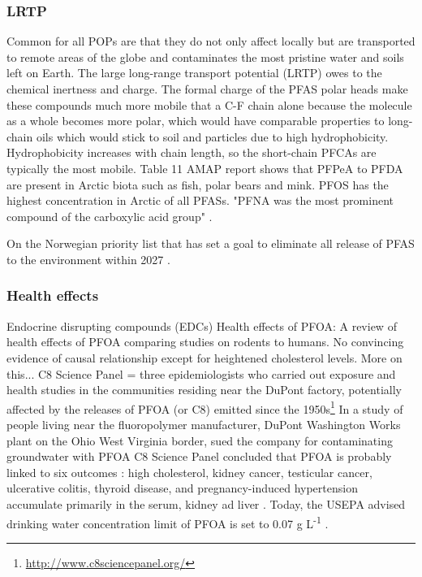 \subsubsection{LRTP}
Common for all POPs are that they do not only affect locally but are transported to remote areas of the globe and contaminates the most pristine water and soils left on Earth. The large long-range transport potential (LRTP) owes to the chemical inertness and charge. The formal charge of the PFAS polar heads make these compounds much more mobile that a C-F chain alone because the molecule as a whole becomes more polar, which would have comparable properties to long-chain oils which would stick to soil and particles due to high hydrophobicity. Hydrophobicity increases with chain length, so the short-chain PFCAs are typically the most mobile. Table 11 AMAP report shows that PFPeA to PFDA are present in Arctic biota such as fish, polar bears and mink. PFOS has the highest concentration in Arctic of all PFASs. "PFNA was the most prominent compound of the carboxylic acid group" \citep{Schlabach2017}.

On the Norwegian priority list that has set a goal to eliminate all release of PFAS to the environment within 2027 \citep{MD2016workshop}.

\subsubsection{Health effects}
Endocrine disrupting compounds (EDCs)
Health effects of PFOA: \citep{Steenland2010} A review of health effects of PFOA comparing studies on rodents to humans. No convincing evidence of causal relationship except for heightened cholesterol levels. More on this... 
C8 Science Panel = three epidemiologists who carried out exposure and health studies in the communities residing near the DuPont factory, potentially affected by the releases of PFOA (or C8) emitted since the 1950s\footnote{\url{http://www.c8sciencepanel.org/}}
In a study of people living near the fluoropolymer manufacturer, DuPont Washington Works plant on the Ohio West Virginia border, sued the company for contaminating groundwater with PFOA C8 Science Panel  concluded that PFOA is probably linked to six outcomes : high cholesterol, kidney cancer, testicular cancer, ulcerative colitis, thyroid disease, and pregnancy-induced hypertension 
accumulate primarily in the serum, kidney ad liver \citep{EPA2014}. Today, the USEPA advised drinking water concentration limit of PFOA is set to 0.07 \textmu g L\textsuperscript{-1} \citep{us2016drinking}. 

